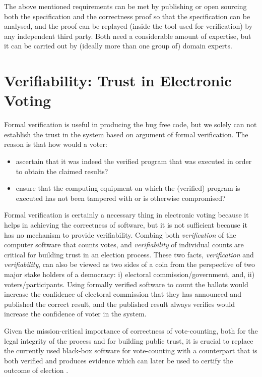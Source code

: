 	\noindent
	The above mentioned requirements can be met by publishing or open sourcing
	both the
	specification and the correctness proof so that the specification
	can be analysed, and the proof can be replayed (inside the tool used for 
	verification) by any independent third party. Both need a
	considerable amount of expertise, but it can be carried out by (ideally
	more than one group of) domain experts.
	

	
	  
	 
		
 \section{Verifiability: Trust in Electronic Voting}
 \label{secback:varifiability}
  Formal verification is useful in producing the 
   bug free code, but we solely can not 
   establish the trust in the system based on argument of 
   formal verification. The reason is that how would a voter:
   \begin{itemize}
   \item ascertain that it was indeed the verified program that was
	executed in order to obtain the claimed results?
	
   \item ensure that the computing equipment on which the (verified)
	program is executed has not been tampered with or is otherwise
	compromised?
	
   \end{itemize}
   
   \noindent
   Formal verification is certainly a necessary thing in electronic voting because 
   it helps in achieving the correctness of software, but it is not sufficient because
   it has no mechanism to provide  verifiability.
   Combing both \emph{verification} of the
	computer software that counts votes, and
	\emph{verifiability} of individual counts are critical for
	building trust in an election process. These two facts, 
	 \emph{verification}  and \emph{verifiability}, 
	 can also be viewed as 
    two sides of a coin from the perspective of two major stake holders of 
    a democracy: i) electoral commission/government, and, ii) voters/participants.  
    Using formally 
    verified software to count the ballots would increase the confidence 
    of electoral commission that they has announced and published the correct result, and 
    the published result always verifies would increase the confidence
    of voter in the system. 
	 
	 
	Given the mission-critical importance of
	 correctness of vote-counting,
	both for the legal integrity of the process and for
	building public trust,  it is crucial to replace the
	currently used black-box software for vote-counting with a
	counterpart that is both verified and produces 
	evidence which can later be used to certify
	the outcome of election \citep{Bernhard:2017:PES} \citep{Rivest:2008:PTRS}.
	
